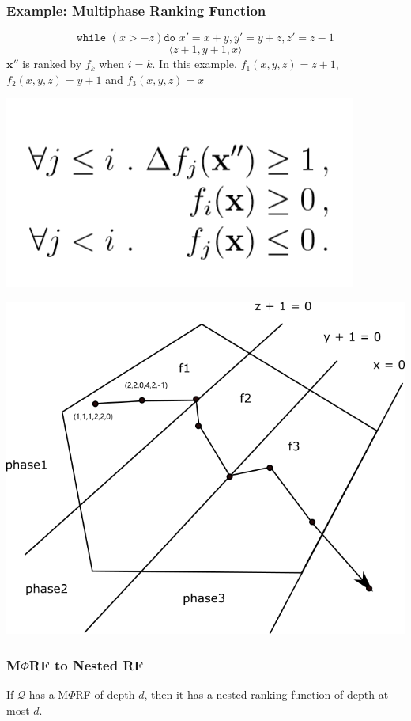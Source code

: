 \documentclass[11pt]{beamer}
\begin{document}
\begin{frame}\frametitle{Example: Multiphase Ranking Function}
\[\texttt{while }( x > -z) \texttt{do } x' = x + y, y' = y + z, z' = z - 1\]
\[\langle z + 1, y + 1, x \rangle\]
$\textbf{x}''$ is ranked by $f_k$ when $i = k$. In this example, $f_1(x, y, z) = z + 1$, $f_2(x, y, z) = y + 1$ and $f_3(x, y, z) = x$
\begin{center}
\includegraphics[scale = 0.2]{3.PNG}

\includegraphics[scale = 0.28]{divide.png}
\end{center}
\end{frame}



\begin{frame}\frametitle{M$\Phi$RF to Nested RF}
\begin{theorem}[1]
If $\mathcal{Q}$ has a M$\Phi$RF of depth $d$, then it has a nested ranking function of depth at most $d$.


\end{theorem}




\end{frame}
\end{document}
